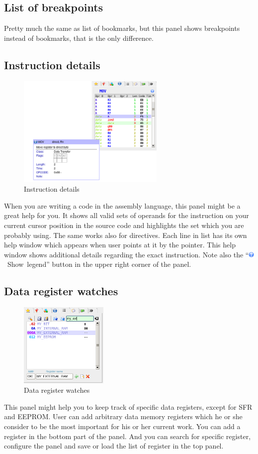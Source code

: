 \documentclass[a4paper,twoside,12pt]{book}
\begin{document}
		\subsection{List of breakpoints}
			Pretty much the same as list of bookmarks, but this panel shows breakpoints instead of bookmarks, that is the only difference.

		\subsection{Instruction details}
			\begin{figure}
				\centering{}
				\includegraphics[width=200pt]{img/008.png}
				\caption{Instruction details}
			\end{figure}
			When you are writing a code in the assembly language, this panel might be a great help for you. It shows all valid sets of operands for the instruction on your current cursor position in the source code and highlights the set which you are probably using. The same works also for directives. Each line in list has its own help window which appears when user points at it by the pointer. This help window shows additional details regarding the exact instruction. Note also the ``\includegraphics[height=8pt]{img/help.png}~Show~legend'' button in the upper right corner of the panel.

		\subsection{Data register watches}
			\begin{figure}
				\centering{}
				\includegraphics[width=120pt]{img/033.png}
				\caption{Data register watches}
			\end{figure}
			This panel might help you to keep track of specific data registers, except for SFR and EEPROM. User can add arbitrary data memory registers which he or she consider to be the most important for his or her current work. You can add a register in the bottom part of the panel. And you can search for specific register, configure the panel and save or load the list of register in the top panel.
\end{document}
